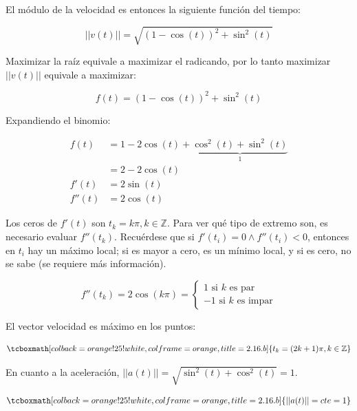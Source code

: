 \documentclass{article}
\renewcommand{\Bbb}{\mathbb}
\begin{document}
El módulo de la velocidad es entonces la siguiente función del tiempo:

\begin{equation}
||v(t)|| = \sqrt{(1-\cos(t))^2 + \sin^2(t)}
\end{equation}

Maximizar la raíz equivale a maximizar el radicando, por lo tanto maximizar $||v(t)||$ equivale a maximizar:

\begin{equation}
f(t) = (1- \cos(t))^2 + \sin^2(t)
\end{equation}

Expandiendo el binomio:

\begin{subequations}
\begin{align}
f(t) &= 1 - 2\cos(t) + \underbrace{\cos^2(t) + \sin^2(t)}_{1} \\
&= 2 - 2 \cos(t) \\
f'(t) &= 2 \sin(t) \\
f''(t) &= 2 \cos(t)
\end{align}
\end{subequations}

Los ceros de $f'(t)$ son $t_k = k\pi, k \in \Bbb Z$. Para ver qué tipo de extremo son, es necesario evaluar $f''(t_k)$. Recuérdese que si $f'(t_i) = 0 \wedge f''(t_i) < 0$, entonces en $t_i$ hay un máximo local; si es mayor a cero, es un mínimo local, y si es cero, no se sabe (se requiere más información).

\begin{equation}
f''(t_k) = 2 \cos(k\pi) = \left\{ \begin{array}{ll}
1 \text{ si } k \text{ es par} \\
-1 \text{ si } k \text{ es impar}
\end{array} \right.
\end{equation}

El vector velocidad es máximo en los puntos:

\begin{equation}
\tcboxmath[colback=orange!25!white,colframe=orange,title=2.16.b]
{
t_k = (2k+1) \pi, k \in \Bbb Z
}
\end{equation}

En cuanto a la aceleración, $||a(t)|| = \sqrt{\sin^2(t) + \cos^2(t)} = 1$.

\begin{equation}
\tcboxmath[colback=orange!25!white,colframe=orange,title=2.16.b]
{
||a(t)|| = \mathop{cte} = 1
}
\end{equation}
\end{document}
